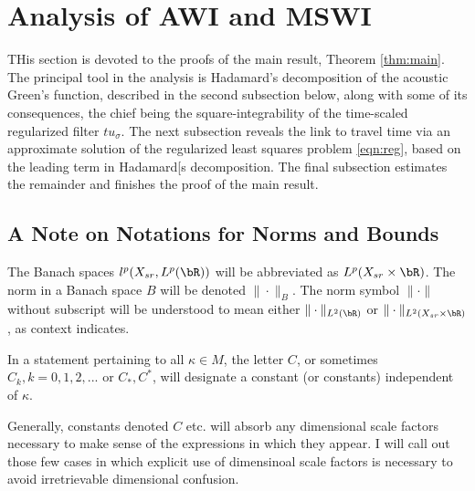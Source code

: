 \section{Analysis of AWI and MSWI}
THis section is devoted to the proofs of the main result, Theorem
\ref{thm:main}.  The principal tool in the analysis is Hadamard's
decomposition of the acoustic Green's function, described in the
second
subsection below, along with some of its consequences, the chief being the
square-integrability of the time-scaled regularized filter
$tu_{\sigma}$. The next subsection reveals the link to travel time via
an approximate solution of the regularized least squares problem
\ref{eqn:reg}, based on the leading term in Hadamard[s decomposition.
The final subsection estimates the remainder and finishes the proof of
the main result.

\subsection{A Note on Notations  for Norms and Bounds}
The Banach spaces
$l^p(X_{sr},L^p(\bR))$ will be abbreviated as $L^p(X_{sr} \times
\bR)$. The norm in a Banach space $B$ will be denoted
$\|\cdot\|_{B}$. The norm symbol
$\|\cdot\|$ without subscript will be understood to mean either
$\|\cdot\|_{L^2(\bR)}$ or $\|\cdot\|_{L^2(X_{sr}\times
  \bR)}$, as context indicates.

In a statement pertaining to all
$\kappa \in M$, the letter $C$, or sometimes $C_k,
k=0,1,2,...$ or
$C_*,C^*$, will designate a constant (or constants) independent of
$\kappa$.

Generally, constants denoted $C$ etc. will absorb any dimensional
scale factors necessary to make sense of the expressions in which they
appear. I will call out those few cases in which explicit use of
dimensinoal scale factors is necessary to avoid irretrievable
dimensional confusion.

